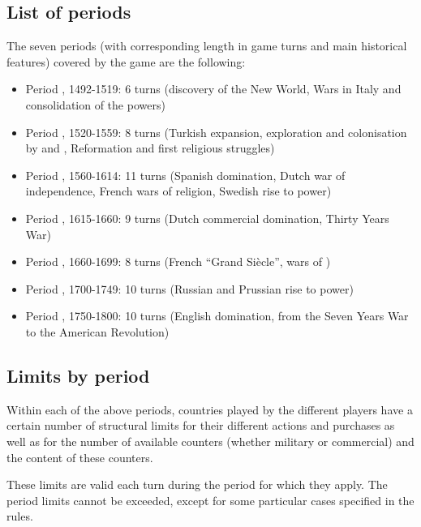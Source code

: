 \subsection{List of periods}
The seven periods (with corresponding length in game turns and main historical
features) covered by the game are the following:
\begin{itemize}
\item Period , 1492-1519: 6 turns (discovery of the New World, Wars
  in Italy and consolidation of the powers)%
\item Period , 1520-1559: 8 turns (Turkish expansion, exploration
  and colonisation by \SPA and \POR, Reformation and first religious
  struggles) %
\item Period , 1560-1614: 11 turns (Spanish domination, Dutch war
  of independence, French wars of religion, Swedish rise to
  power) %
\item Period , 1615-1660: 9 turns (Dutch commercial domination,
  Thirty Years War)%
\item Period , 1660-1699: 8 turns (French ``Grand Si\`{e}cle'', wars
  of )%
\item Period , 1700-1749: 10 turns (Russian and Prussian rise to
  power)%
\item Period , 1750-1800: 10 turns (English domination, from the
  Seven Years War to the American Revolution)%
\end{itemize}



\subsection{Limits by period}
\label{chThePowers:Limits}
\aparag Within each of the above periods, countries played by the different
players have a certain number of structural limits for their different actions
and purchases as well as for the number of available counters (whether
military or commercial) and the content of these counters.

\aparag[Limits] These limits are valid each turn during the period for which
they apply.
\bparag The period limits cannot be exceeded, except for some particular cases
specified in the rules.

